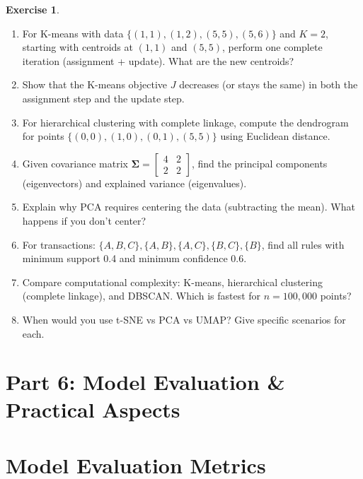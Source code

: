 \documentclass[11pt,twoside]{article}
\numberwithin{equation}{section}
\newcommand{\mat}[1]{\bm{#1}}
\theoremstyle{plain}
\theoremstyle{definition}
\newtheorem{exercise}[theorem]{Exercise}
\theoremstyle{remark}
\begin{document}
\begin{exercise}
\begin{enumerate}
\item For K-means with data $\{(1,1), (1,2), (5,5), (5,6)\}$ and $K=2$, starting with centroids at $(1,1)$ and $(5,5)$, perform one complete iteration (assignment + update). What are the new centroids?

\item Show that the K-means objective $J$ decreases (or stays the same) in both the assignment step and the update step.

\item For hierarchical clustering with complete linkage, compute the dendrogram for points $\{(0,0), (1,0), (0,1), (5,5)\}$ using Euclidean distance.

\item Given covariance matrix $\mat{\Sigma} = \begin{bmatrix} 4 & 2 \\ 2 & 2 \end{bmatrix}$, find the principal components (eigenvectors) and explained variance (eigenvalues).

\item Explain why PCA requires centering the data (subtracting the mean). What happens if you don't center?

\item For transactions: $\{A,B,C\}, \{A,B\}, \{A,C\}, \{B,C\}, \{B\}$, find all rules with minimum support 0.4 and minimum confidence 0.6.

\item Compare computational complexity: K-means, hierarchical clustering (complete linkage), and DBSCAN. Which is fastest for $n=100,000$ points?

\item When would you use t-SNE vs PCA vs UMAP? Give specific scenarios for each.
\end{enumerate}
\end{exercise}

\section*{Part 6: Model Evaluation \& Practical Aspects}

\section{Model Evaluation Metrics}
\label{sec:metrics}
\end{document}
